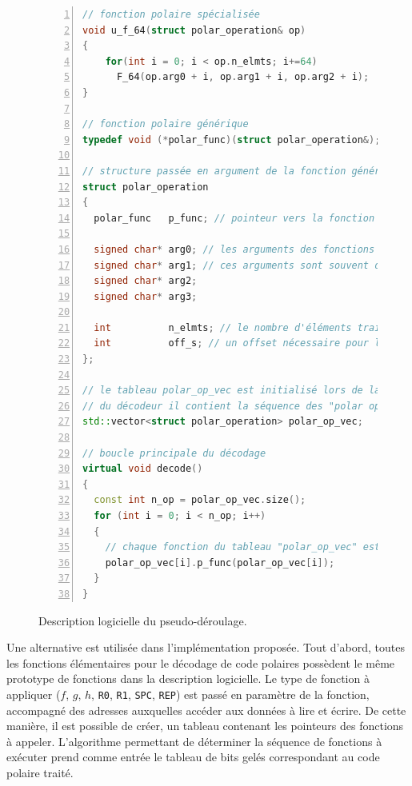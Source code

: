 \begin{figure}[htp]
\begin{lstlisting}[language=C++, numbers=left, numbersep=0.3em, tabsize=2, basicstyle=\footnotesize\ttfamily]
// fonction polaire spécialisée
void u_f_64(struct polar_operation& op)
{
    for(int i = 0; i < op.n_elmts; i+=64)
      F_64(op.arg0 + i, op.arg1 + i, op.arg2 + i);
}

// fonction polaire générique
typedef void (*polar_func)(struct polar_operation&);

// structure passée en argument de la fonction générique
struct polar_operation
{
  polar_func   p_func; // pointeur vers la fonction polaire spécialisée 

  signed char* arg0; // les arguments des fonctions polaires spécialisées
  signed char* arg1; // ces arguments sont souvent des adresses
  signed char* arg2;
  signed char* arg3;

  int          n_elmts; // le nombre d'éléments traités en parallèle
  int          off_s; // un offset nécessaire pour l'accès aux PSs
};

// le tableau polar_op_vec est initialisé lors de la construction
// du décodeur il contient la séquence des "polar operation"
std::vector<struct polar_operation> polar_op_vec;

// boucle principale du décodage
virtual void decode()
{
  const int n_op = polar_op_vec.size();
  for (int i = 0; i < n_op; i++)
  {
    // chaque fonction du tableau "polar_op_vec" est appelée
    polar_op_vec[i].p_func(polar_op_vec[i]); 
  }
}
\end{lstlisting}
\caption{Description logicielle du pseudo-déroulage.}
\label{fig:tensilica_code}
\end{figure}
Une alternative est utilisée dans l'implémentation proposée. Tout d'abord, toutes les fonctions élémentaires pour le décodage de code polaires possèdent le même prototype de fonctions dans la description logicielle. Le type de fonction à appliquer ($f$, $g$, $h$, \texttt{R0}, \texttt{R1}, \texttt{SPC}, \texttt{REP}) est passé en paramètre de la fonction, accompagné des adresses auxquelles accéder aux données à lire et écrire. De cette manière, il est possible de créer, un tableau contenant les pointeurs des fonctions à appeler. L'algorithme permettant de déterminer la séquence de fonctions à exécuter prend comme entrée le tableau de bits gelés correspondant au code polaire traité.



